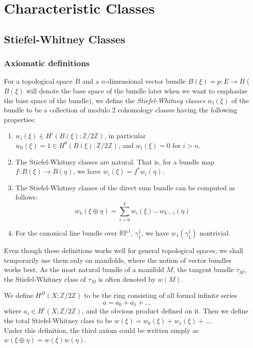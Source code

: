 \part{Characteristic Classes}

\chapter{Stiefel-Whitney Classes}

\section{Axiomatic definitions}

	\begin{defn} \label{SW_classes}
		For a topological space $B$ and a $n$-dimensional vector bundle $B(\xi)=p:E\to B$ ($B(\xi)$ will denote the base space of the bundle later when we want to emphasize the base space of the bundle), we define the \emph{Stiefel-Whitney classes} $w_i(\xi)$ of the bundle to be a collection of modulo 2 cohomology classes having the following properties: 
		\begin{enumerate}
			\item $w_i(\xi)\in H^i(B(\xi);\mathbb{Z}/2\mathbb{Z})$, in particular $w_0(\xi)=1\in H^0(B(\xi);\mathbb{Z}/2\mathbb{Z})$, and $w_i(\xi)=0$ for $i>n$. 
			\item The Stiefel-Whitney classes are natural. That is, for a bundle map $f:B(\xi)\to B(\eta)$, we have $w_i(\xi)=f^* w_i(\eta)$. 
			\item The Stiefel-Whitney classes of the direct sum bundle can be computed as follows: 
				\[ w_k(\xi\oplus\eta)=\sum_{i=0}^k w_i(\xi)\smile w_{k-i}(\eta) \]
			\item For the canonical line bundle over $\mathbb{RP}^1$, $\gamma_1^1$, we have $w_1(\gamma_1^1)$ nontrivial. 
		\end{enumerate}
	\end{defn}

	\begin{remark}
		Even though these definitions works well for general topological spaces, we shall temporarily use them only on manifolds, where the notion of vector bundles works best. As the most natural bundle of a manifold $M$, the tangent bundle $\tau_M$, the Stiefel-Whitney class of $\tau_M$ is often denoted by $w(M)$. 
	\end{remark}

	\begin{defn}
		We define $H^\Pi(X;\mathbb{Z}/2\mathbb{Z})$ to be the ring consisting of all formal infinite series 
		\[ a=a_0+a_1+\dots \]
		where $a_i\in H^i(X;\mathbb{Z}/2\mathbb{Z})$, and the obvious product defined on it. Then we define the total Stiefel-Whitney class to be $w(\xi)=w_0(\xi)+w_1(\xi)+\dots$. \\
		Under this definition, the third axiom could be written simply as $w(\xi\oplus\eta)=w(\xi)w(\eta)$. 
	\end{defn}

